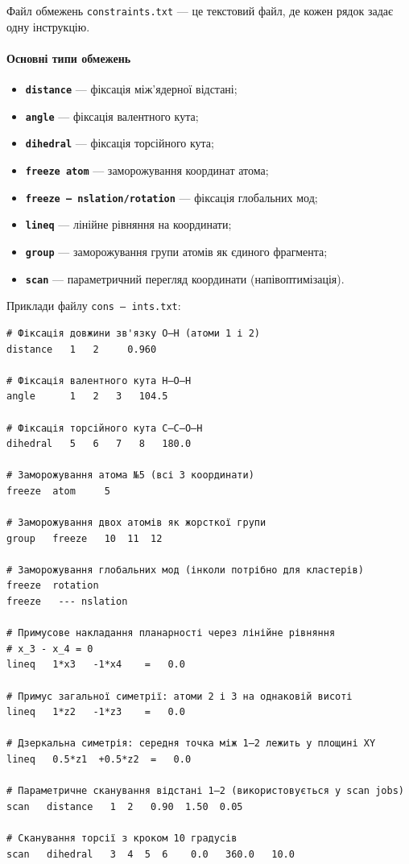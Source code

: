 Файл обмежень \texttt{constraints.txt} --- це текстовий файл, де кожен рядок задає одну інструкцію.

\paragraph{Основні типи обмежень}
\begin{itemize}
    \item \textbf{\texttt{distance}} --- фіксація між'ядерної відстані;
    \item \textbf{\texttt{angle}} --- фіксація валентного кута;
    \item \textbf{\texttt{dihedral}} --- фіксація торсійного кута;
    \item \textbf{\texttt{freeze atom}} --- заморожування координат атома;
    \item \textbf{\texttt{freeze  --- nslation/rotation}} --- фіксація глобальних мод;
    \item \textbf{\texttt{lineq}} --- лінійне рівняння на координати;
    \item \textbf{\texttt{group}} --- заморожування групи атомів як єдиного фрагмента;
    \item \textbf{\texttt{scan}} --- параметричний перегляд координати (напівоптимізація).
\end{itemize}

Приклади файлу \texttt{cons --- ints.txt}:

\begin{verbatim}
# Фіксація довжини зв'язку O–H (атоми 1 і 2)
distance   1   2     0.960

# Фіксація валентного кута H–O–H
angle      1   2   3   104.5

# Фіксація торсійного кута C–C–O–H
dihedral   5   6   7   8   180.0

# Заморожування атома №5 (всі 3 координати)
freeze  atom     5

# Заморожування двох атомів як жорсткої групи
group   freeze   10  11  12

# Заморожування глобальних мод (інколи потрібно для кластерів)
freeze  rotation
freeze   --- nslation

# Примусове накладання планарності через лінійне рівняння
# x_3 - x_4 = 0
lineq   1*x3   -1*x4    =   0.0

# Примус загальної симетрії: атоми 2 і 3 на однаковій висоті
lineq   1*z2   -1*z3    =   0.0

# Дзеркальна симетрія: середня точка між 1–2 лежить у площині XY
lineq   0.5*z1  +0.5*z2  =   0.0

# Параметричне сканування відстані 1–2 (використовується у scan jobs)
scan   distance   1  2   0.90  1.50  0.05

# Сканування торсії з кроком 10 градусів
scan   dihedral   3  4  5  6    0.0   360.0   10.0
\end{verbatim}

